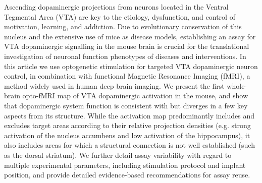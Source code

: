 Ascending dopaminergic projections from neurons located in the Ventral Tegmental Area (VTA) are key to the etiology, dysfunction, and control of motivation, learning, and addiction.
Due to evolutionary conservation of this nucleus and the extensive use of mice as disease models, establishing an assay for VTA dopaminergic signalling in the mouse brain is crucial for the translational investigation of neuronal function phenotypes of diseases and interventions.
In this article we use optogenetic stimulation for targeted VTA dopaminergic neuron control, in combination with functional Magnetic Resonance Imaging (fMRI), a method widely used in human deep brain imaging.
We present the first whole-brain opto-fMRI map of VTA dopaminergic activation in the mouse, and show that dopaminergic system function is consistent with but diverges in a few key aspects from its structure.
While the activation map predominantly includes and excludes target areas according to their relative projection densities (e.g. strong activation of the nucleus accumbens and low activation of the hippocampus), it also includes areas for which a structural connection is not well established (such as the dorsal striatum).
We further detail assay variability with regard to multiple experimental parameters, including stimulation protocol and implant position, and provide detailed evidence-based recommendations for assay reuse.
